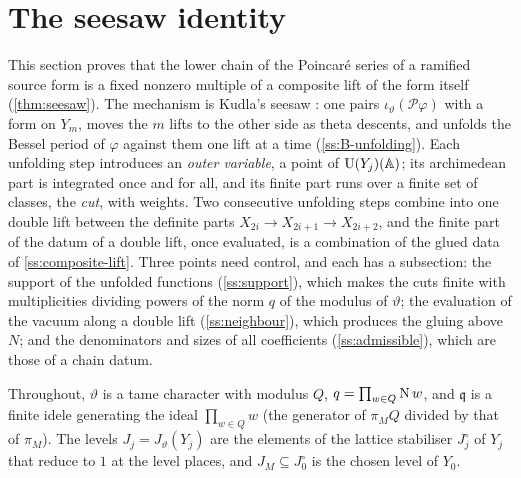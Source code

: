 \section{The seesaw identity}\label{sec:seesaw}

This section proves that the lower chain of the Poincar\'e series of a ramified source form is a fixed
nonzero multiple of a composite lift of the form itself (\cref{thm:seesaw}). The mechanism is Kudla's seesaw
\cite{Kudla1984}: one pairs $\iota_\vartheta(\mathcal P\varphi)$ with a form on $Y_m$, moves the $m$ lifts to
the other side as theta descents, and unfolds the Bessel period of $\varphi$ against them one lift at a time
(\cref{ss:B-unfolding}). Each unfolding step introduces an \emph{outer variable}, a point of $\operatorname{U}(Y_j)(\mathbb{A})$;
its archimedean part is integrated once and for all, and its finite part runs over a finite set of classes,
the \emph{cut}, with weights. Two consecutive unfolding steps combine into one double lift between the
definite parts $X_{2i}\to X_{2i+1}\to X_{2i+2}$, and the finite part of the datum of a double lift, once
evaluated, is a combination of the glued data of \cref{ss:composite-lift}. Three points need control, and
each has a subsection: the support of the unfolded functions (\cref{ss:support}), which makes the cuts
finite with multiplicities dividing powers of the norm $q$ of the modulus of $\vartheta$; the evaluation of
the vacuum along a double lift (\cref{ss:neighbour}), which produces the gluing above $N$; and the
denominators and sizes of all coefficients (\cref{ss:admissible}), which are those of a chain datum.

Throughout, $\vartheta$ is a tame character with modulus $Q$, $q=\prod_{w\in Q}\operatorname{N} w$, and $\mathfrak q$ is a
finite idele generating the ideal $\prod_{w\in Q}w$ (the generator of $\pi_MQ$ divided by that of $\pi_M$). The
levels $J_j=J_\vartheta(Y_j)$ are the elements of the lattice stabiliser $J^\circ_j$ of $Y_j$ that reduce to $1$ at
the level places, and $J_M\subseteq J^\circ_0$ is the chosen level of $Y_0$.

